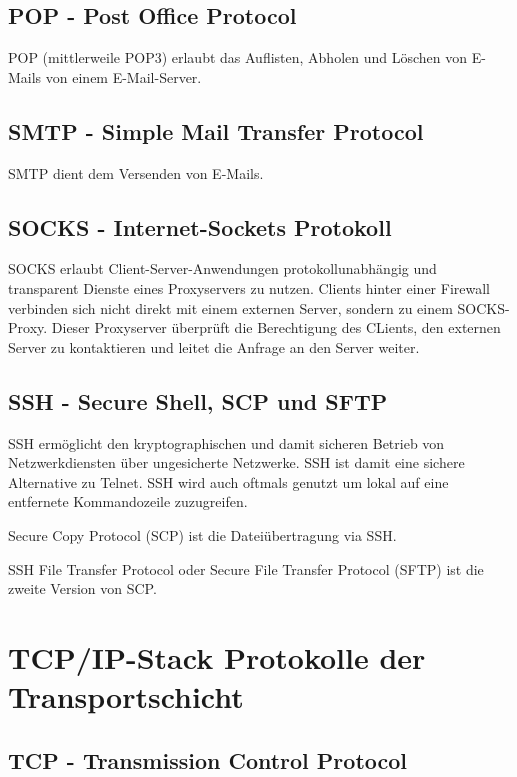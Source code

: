\subsection{POP - Post Office Protocol}

POP (mittlerweile POP3) erlaubt das Auflisten, Abholen und Löschen von E-Mails von einem E-Mail-Server.

\subsection{SMTP - Simple Mail Transfer Protocol}

SMTP dient dem Versenden von E-Mails.

\subsection{SOCKS - Internet-Sockets Protokoll}

SOCKS erlaubt Client-Server-Anwendungen protokollunabhängig und transparent Dienste eines Proxyservers zu nutzen. Clients hinter einer Firewall verbinden sich nicht direkt mit einem externen Server, sondern zu einem SOCKS-Proxy. Dieser Proxyserver überprüft die Berechtigung des CLients, den externen Server zu kontaktieren und leitet die Anfrage an den Server weiter.

\subsection{SSH - Secure Shell, SCP und SFTP}

SSH ermöglicht den kryptographischen und damit sicheren Betrieb von Netzwerkdiensten über ungesicherte Netzwerke. SSH ist damit eine sichere Alternative zu Telnet. SSH wird auch oftmals genutzt um lokal auf eine entfernete Kommandozeile zuzugreifen.

Secure Copy Protocol (SCP) ist die Dateiübertragung via SSH.

SSH File Transfer Protocol oder Secure File Transfer Protocol (SFTP) ist die zweite Version von SCP.

\section{TCP/IP-Stack Protokolle der Transportschicht}

\subsection{TCP - Transmission Control Protocol}

